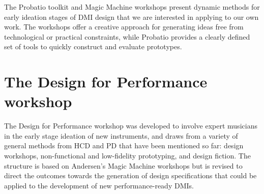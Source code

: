 \documentclass[letterpaper, 12pt]{article}
\begin{document}
The Probatio toolkit and Magic Machine workshops present dynamic methods for early ideation stages of DMI design that we are interested in applying to our own work. The workshops offer a creative approach for generating ideas free from technological or practical constraints, while Probatio provides a clearly defined set of tools to quickly construct and evaluate prototypes. 

\section{The Design for Performance workshop}
\label{ch3-sec:design-for-performance-workshop}

The Design for Performance workshop was developed to involve expert musicians in the early stage ideation of new instruments, and draws from a variety of general methods from HCD and PD that have been mentioned so far: design workshops, non-functional and low-fidelity prototyping, and design fiction. 
The structure is based on Andersen's Magic Machine workshops but is revised to direct the outcomes towards the generation of design specifications that could be applied to the development of new performance-ready DMIs. 
\end{document}
